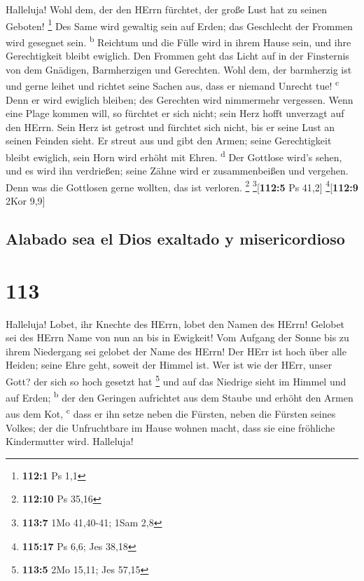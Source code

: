  Halleluja! Wohl dem, der den HErrn fürchtet, der große
Lust hat zu seinen Geboten! \footnote{\textbf{112:1} Ps 1,1}
 Des Same wird gewaltig sein auf Erden; das Geschlecht der
Frommen wird gesegnet sein. \textsuperscript{b}  Reichtum
und die Fülle wird in ihrem Hause sein, und ihre Gerechtigkeit bleibt
ewiglich.  Den Frommen geht das Licht auf in der
Finsternis von dem Gnädigen, Barmherzigen und Gerechten. 
Wohl dem, der barmherzig ist und gerne leihet und richtet seine Sachen
aus, dass er niemand Unrecht tue! \textsuperscript{c} 
Denn er wird ewiglich bleiben; des Gerechten wird nimmermehr vergessen.
 Wenn eine Plage kommen will, so fürchtet er sich nicht;
sein Herz hofft unverzagt auf den HErrn.  Sein Herz ist
getrost und fürchtet sich nicht, bis er seine Lust an seinen Feinden
sieht.  Er streut aus und gibt den Armen; seine
Gerechtigkeit bleibt ewiglich, sein Horn wird erhöht mit Ehren.
\textsuperscript{d}  Der Gottlose wird's sehen, und es
wird ihn verdrießen; seine Zähne wird er zusammenbeißen und vergehen.
Denn was die Gottlosen gerne wollten, das ist verloren. \footnote{\textbf{112:10}
  Ps 35,16} \footnote{\textbf{113:7} 1Mo 41,40-41; 1Sam 2,8}{[}\textbf{112:5}
Ps 41,2{]} \footnote{\textbf{115:17} Ps 6,6; Jes 38,18}{[}\textbf{112:9}
2Kor 9,9{]}

\hypertarget{alabado-sea-el-dios-exaltado-y-misericordioso}{%
\subsection{Alabado sea el Dios exaltado y
misericordioso}\label{alabado-sea-el-dios-exaltado-y-misericordioso}}

\hypertarget{section-112}{%
\section{113}\label{section-112}}

 Halleluja! Lobet, ihr Knechte des HErrn, lobet den Namen
des HErrn!  Gelobet sei des HErrn Name von nun an bis in
Ewigkeit!  Vom Aufgang der Sonne bis zu ihrem Niedergang
sei gelobet der Name des HErrn!  Der HErr ist hoch über
alle Heiden; seine Ehre geht, soweit der Himmel ist.  Wer
ist wie der HErr, unser Gott? der sich so hoch gesetzt hat \footnote{\textbf{113:5}
  2Mo 15,11; Jes 57,15}  und auf das Niedrige sieht im
Himmel und auf Erden; \textsuperscript{b}  der den
Geringen aufrichtet aus dem Staube und erhöht den Armen aus dem Kot,
\textsuperscript{c}  dass er ihn setze neben die Fürsten,
neben die Fürsten seines Volkes;  der die Unfruchtbare im
Hause wohnen macht, dass sie eine fröhliche Kindermutter wird.
Halleluja!

